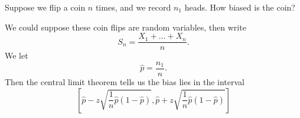 Suppose we flip a coin $n$ times, and we record $n_{1}$ heads. How
biased is the coin?

\M
We could suppose these coin flips are random variables, then write
\begin{equation}
S_{n} =\frac{X_{1}+\dots+X_{n}}{n}.
\end{equation}
We let
\begin{equation}
\widehat{p}=\frac{n_{1}}{n}.
\end{equation}
Then the central limit theorem tells us the bias lies in the interval
\begin{equation}
\left[\widehat{p}- z\sqrt{\frac{1}{n}\widehat{p}(1-\widehat{p})},
\widehat{p}+z\sqrt{\frac{1}{n}\widehat{p}(1-\widehat{p})}\right]
\end{equation}
